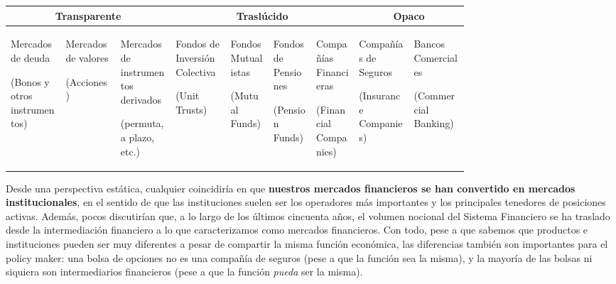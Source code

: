 \documentclass[10pt,a4paper]{article}
\begin{document}
\begin{center}
\begin{tabular}{|p{0.09\linewidth}|p{0.09\linewidth}|p{0.09\linewidth}|p{0.09\linewidth}|p{0.07\linewidth}|p{0.07\linewidth}|p{0.07\linewidth}|p{0.09\linewidth}|p{0.09\linewidth}|}
\hline
\multicolumn{3}{|c|}{\textbf{Transparente}} &
\multicolumn{4}{|c|}{\textbf{Traslúcido}} &
\multicolumn{2}{c|}{\textbf{Opaco}}\\
\hline
\parbox{1\linewidth}{\centering\scriptsize Mercados de deuda\par\tiny(Bonos y otros instrumentos)} &
\parbox{1\linewidth}{\centering\scriptsize Mercados de valores\par\tiny(Acciones)} &
\parbox{1\linewidth}{\centering\scriptsize Mercados de instrumentos derivados\par\tiny(permuta, a plazo, etc.)} &
\parbox{1\linewidth}{\centering\scriptsize Fondos de Inversión Colectiva\par\tiny(Unit Trusts)} &
\parbox{1\linewidth}{\centering\scriptsize Fondos Mutualistas\par\tiny(Mutual Funds)} &
\parbox{1\linewidth}{\centering\scriptsize Fondos de Pensiones\par\tiny(Pension Funds)} &
\parbox{1\linewidth}{\centering\scriptsize Compañías Financieras\par\tiny(Financial Companies)} &
\parbox{1\linewidth}{\centering\scriptsize Compañías de Seguros\par\tiny(Insurance Companies)} &
\parbox{1\linewidth}{\centering\scriptsize Bancos Comerciales\par\tiny(Commercial Banking)}\\
\hline
\end{tabular}
\end{center}

Desde una perspectiva estática, cualquier coincidiría en que \textbf{nuestros mercados financieros se han convertido en mercados institucionales}, en el sentido de que las instituciones suelen ser los operadores más importantes y los principales tenedores de posiciones activas. Además, pocos discutirían que, a lo largo de los últimos cincuenta años, el volumen nocional del Sistema Financiero se ha traslado desde la intermediación financiero a lo que caracterizamos como mercados financieros. Con todo, pese a que sabemos que productos e instituciones pueden ser muy diferentes a pesar de compartir la misma función económica, las diferencias también son importantes para el policy maker: una bolsa de opciones no es una compañía de seguros (pese a que la función sea la misma), y la mayoría de las bolsas ni siquiera son intermediarios financieros (pese a que la función \textit{pueda} ser la misma).
\end{document}
